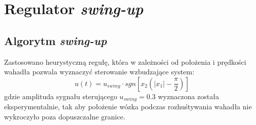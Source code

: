 \section{Regulator \textit{swing-up}}
\subsection{Algorytm \textit{swing-up}}
Zastosowano heurystyczną regułę, która w zależności od położenia i prędkości wahadła pozwala wyznaczyć sterowanie wzbudzające system:
\begin{equation}  
u(t) = u_{swing}\cdot sgn[x_2(|x_1|-\frac{\pi}{2})]
\end{equation} 
gdzie amplituda sygnału sterującego $u_{swing} = 0.3$ wyznaczona została eksperymentalnie, tak aby położenie wózka podczas rozhuśtywania wahadła nie wykroczyło poza dopuszczalne granice. 

